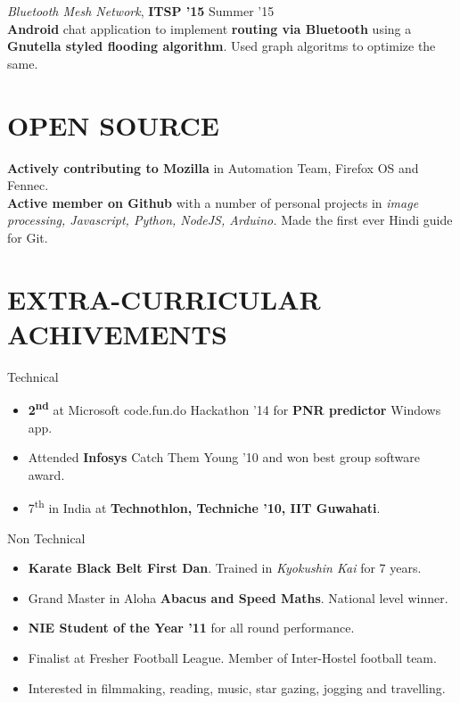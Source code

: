 \documentclass[margin, 10pt]{res} %
\begin{document}
\begin{resume}
{\sl Bluetooth Mesh Network}, \textbf{ITSP '15} \hfill Summer '15 \\
\textbf{Android} chat application to implement \textbf{routing via Bluetooth} using a \textbf{Gnutella styled flooding algorithm}. Used graph algoritms to optimize the same.

\section{OPEN SOURCE}
\textbf{Actively contributing to Mozilla} in Automation Team, Firefox OS and Fennec.\\ 
\textbf{Active member on Github} with a number of personal projects in \textit{image processing, Javascript, Python, NodeJS, Arduino.} Made the first ever Hindi guide for Git.

\section{EXTRA-CURRICULAR \\ ACHIVEMENTS} 
Technical
\begin{itemize}\itemsep -13pt
\item\textbf{2\textsuperscript{nd}} at Microsoft code.fun.do Hackathon '14 for \textbf{PNR predictor} Windows app.\\
\item Attended \textbf{Infosys} Catch Them Young '10 and won best group software award.\\
\item 7\textsuperscript{th} in India at \textbf{Technothlon, Techniche '10, IIT Guwahati}.
\end{itemize}
Non Technical 
\begin{itemize}\itemsep -13pt
\item \textbf{Karate Black Belt First Dan}. Trained in \textit{Kyokushin Kai} for 7 years.\\
\item Grand Master in Aloha \textbf{Abacus and Speed Maths}. National level winner.\\
\item \textbf{NIE Student of the Year '11} for all round performance.\\
\item Finalist at Fresher Football League. Member of Inter-Hostel football team.\\
\item Interested in filmmaking, reading, music, star gazing, jogging and travelling.
\end{itemize}


\end{resume}
\end{document}
